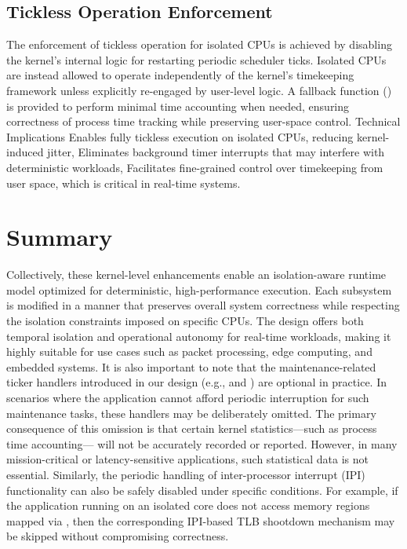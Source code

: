 \documentclass[letterpaper]{article}
\begin{document}
\subsection{Tickless Operation Enforcement}
The enforcement of tickless operation for isolated CPUs is achieved by disabling the kernel's
internal logic for restarting periodic scheduler ticks. Isolated CPUs are instead allowed to operate
independently of the kernel's timekeeping framework unless explicitly re-engaged by user-level
logic.
A fallback function () is provided to perform minimal time accounting when needed, ensuring
correctness of process time tracking while preserving user-space control.
Technical Implications
Enables fully tickless execution on isolated CPUs, reducing kernel-induced jitter,
Eliminates background timer interrupts that may interfere with deterministic workloads,
Facilitates fine-grained control over timekeeping from user space, which is critical in real-time
systems.

\section{Summary}
Collectively, these kernel-level enhancements enable an isolation-aware runtime model optimized
for deterministic, high-performance execution. Each subsystem is modified in a manner that
preserves overall system correctness while respecting the isolation constraints imposed on
specific CPUs. The design offers both temporal isolation and operational autonomy for real-time
workloads, making it highly suitable for use cases such as packet processing, edge computing, and
embedded systems.
It is also important to note that the maintenance-related ticker handlers introduced in our design
(e.g., and ) are optional in practice. In scenarios where the application cannot afford periodic
interruption for such maintenance tasks, these handlers may be deliberately omitted. The primary
consequence of this omission is that certain kernel statistics—such as process time accounting—
will not be accurately recorded or reported. However, in many mission-critical or latency-sensitive
applications, such statistical data is not essential. Similarly, the periodic handling of inter-processor
interrupt (IPI) functionality can also be safely disabled under specific conditions. For example, if
the application running on an isolated core does not access memory regions mapped via , then the
corresponding IPI-based TLB shootdown mechanism may be skipped without compromising
correctness.
\newpage
 



% 
\end{document}
